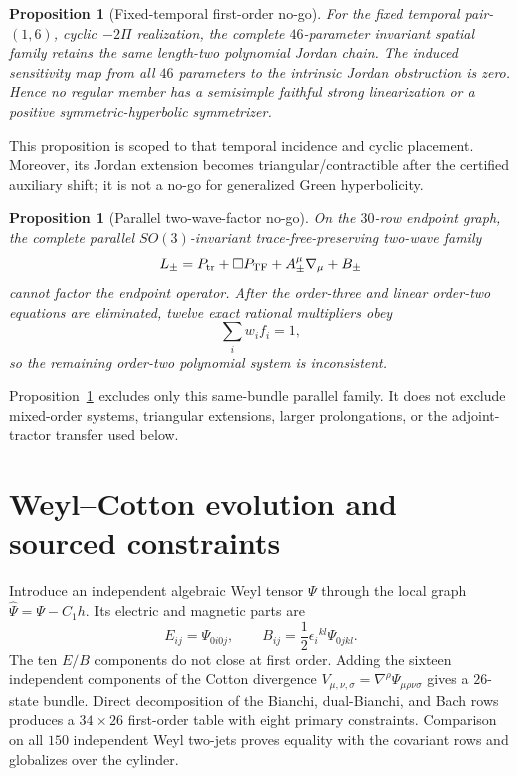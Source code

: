 \documentclass[11pt]{article}
\newtheorem{proposition}[theorem]{Proposition}
\theoremstyle{definition}
\theoremstyle{remark}
\begin{document}
\begin{proposition}[Fixed-temporal first-order no-go]\label{prop:first-no-go}
For the fixed temporal pair-$(1,6)$, cyclic $-2\Pi$ realization, the complete
$46$-parameter invariant spatial family retains the same length-two
polynomial Jordan chain.  The induced sensitivity map from all $46$
parameters to the intrinsic Jordan obstruction is zero.  Hence no regular
member has a semisimple faithful strong linearization or a positive
symmetric-hyperbolic symmetrizer.
\end{proposition}

This proposition is scoped to that temporal incidence and cyclic placement.
Moreover, its Jordan extension becomes triangular/contractible after the
certified auxiliary shift; it is not a no-go for generalized Green
hyperbolicity.

\begin{proposition}[Parallel two-wave-factor no-go]\label{prop:factor-no-go}
On the $30$-row endpoint graph, the complete parallel $SO(3)$-invariant
trace-free-preserving two-wave family
\begin{equation}
 L_\pm=P_{\rm tr}+\Box P_{\rm TF}
       +A_\pm^\mu\nabla_\mu+B_\pm
\end{equation}
cannot factor the endpoint operator.  After the order-three and linear
order-two equations are eliminated, twelve exact rational multipliers obey
\begin{equation}\label{eq:nullstellensatz}
 \sum_i w_i f_i=1,
\end{equation}
so the remaining order-two polynomial system is inconsistent.
\end{proposition}

Proposition~\ref{prop:factor-no-go} excludes only this same-bundle parallel
family.  It does not exclude mixed-order systems, triangular extensions,
larger prolongations, or the adjoint-tractor transfer used below.

\section{Weyl--Cotton evolution and sourced constraints}
\label{sec:curvature}

Introduce an independent algebraic Weyl tensor $\Psi$ through the local graph
$\widehat\Psi=\Psi-C_1h$.  Its electric and magnetic parts are
\begin{equation}
 E_{ij}=\Psi_{0i0j},
 \qquad B_{ij}=\frac12\epsilon_i{}^{kl}\Psi_{0jkl}.
\end{equation}
The ten $E/B$ components do not close at first order.  Adding the sixteen
independent components of the Cotton divergence
$V_{\mu,\nu,\sigma}=\nabla^\rho\Psi_{\mu\rho\nu\sigma}$ gives a $26$-state
bundle.  Direct decomposition of the Bianchi, dual-Bianchi, and Bach rows
produces a $34\times26$ first-order table with eight primary constraints.
Comparison on all $150$ independent Weyl two-jets proves equality with the
covariant rows and globalizes over the cylinder.
\end{document}
